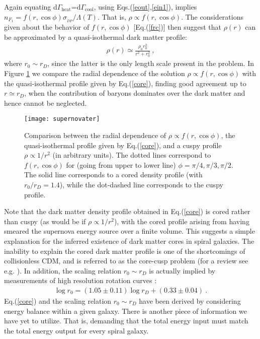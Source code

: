 \documentclass[12pt]{article}
\begin{document}
{{Again equating d$\Gamma _{\text{heat}}$=d$\Gamma _{\text{cool}}$, using Eqs.(\ref{eout},\ref{ein1}), implies $n _{F_1} = f(r,\cos \phi)\sigma _{_{DP}}/\Lambda (T)$. That is, $\rho \propto f(r,\cos \phi )$. The considerations given about the behavior of $f(r,\cos \phi)$ [Eq.(\ref{frc})] then suggest that $\rho (r)$ can be approximated by a quasi-isothermal dark matter profile:
%
\begin{eqnarray}
\rho (r) \simeq \frac{\rho _0r _0 ^2}{r ^2 + r _0 ^2} \ ,
\label{core}
\end{eqnarray}
%
where $r _0 \sim r_D$, since the latter is the only length scale present in the problem. In Figure \ref{fig:Comparison core f} we compare the radial dependence of the solution $\rho \propto f(r,\cos \phi)$ with the quasi-isothermal profile given by Eq.(\ref{core}), finding good agreement up to $r \simeq r _D$, when the contribution of baryons dominates over the dark matter and hence cannot be neglected.

\begin{figure}[htpb]
    \vskip 1cm
    \centering
        \texttt{[image: supernovater]}
    \caption{Comparison between the radial dependence of $\rho \propto f(r,\cos \phi)$, the quasi-isothermal profile given by Eq.(\ref{core}), and a cuspy profile $\rho \propto 1/r ^2$ (in arbitrary units). The dotted lines correspond to $f(r,\cos \phi)$ for (going from upper to lower line) $\phi=\pi/4,\pi/3,\pi/2$. The solid line corresponds to a cored density profile (with $r _0/r _D = 1.4$), while the dot-dashed line corresponds to the cuspy profile.}
    \label{fig:Comparison core f}
    \vskip 0.8cm
\end{figure}

Note that the dark matter density profile obtained in Eq.(\ref{core}) is cored rather than cuspy (as would be if $\rho \propto 1/r ^2$), with the cored profile arising from having smeared the supernova energy source over a finite volume. This suggests a simple explanation for the inferred existence of dark matter cores in spiral galaxies. The inability to explain the cored dark matter profile is one of the shortcomings of collisionless CDM, and is referred to as the core-cusp problem (for a review see e.g. \cite{deblok}). In addition, the scaling relation $r _0 \sim r_D$ is actually implied by measurements of high resolution rotation curves \cite{donato}:
%
\begin{eqnarray}
\log r _0 = (1.05 \pm 0.11) \log r_D + (0.33 \pm 0.04) \ .
\end{eqnarray}
%
Eq.(\ref{core}) and the scaling relation $r _0 \sim r _D$ have been derived by considering energy balance within a given galaxy. There is another piece of information we have yet to utilize. That is, demanding that the total energy input must match the total energy output for every spiral galaxy.

}}
\end{document}
